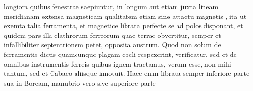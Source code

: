 longiora quibus fenestrae saepiuntur, in longum aut etiam juxta lineam meridianam extensa magneticam qualitatem etiam sine attactu magnetis\protect{} ,  ita ut exemta talia ferramenta, et magnetice librata perfecte se ad polos\protect{} disponant, et quidem pars illa clathrorum ferreorum quae terrae obvertitur, semper et infallibiliter septentrionem petet, opposita austrum. Quod non solum de ferramentis dictis quamcunque plagam coeli respexerint, verificatur, sed et de omnibus instrumentis ferreis quibus ignem tractamus, verum esse, non mihi tantum, sed et Cabaeo\protect{} aliisque innotuit. Haec enim librata semper inferiore parte sua in Boream, manubrio vero sive superiore parte 